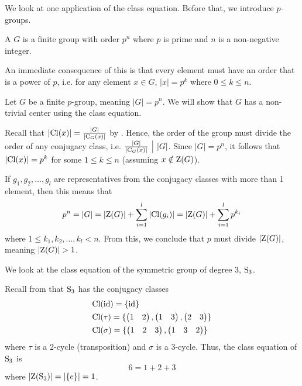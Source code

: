 We look at one application of the class equation. Before that, we introduce $p$-groups.

\begin{definition}
    A  $G$ is a finite group with order $p^n$ where $p$ is prime and $n$ is a non-negative integer.
\end{definition}
An immediate consequence of this is that every element must have an order that is a power of $p$, i.e. for any element $x \in G$, $|x| = p^k$ where $0 \leq k \leq n$.

\begin{example}\label{example-group-with-prime-power-order-has-non-trivial-center}
    Let $G$ be a finite $p$-group, meaning $|G| = p^n$. We will show that $G$ has a non-trivial center using the class equation.

    Recall that $|\mathrm{Cl}(x)| = \frac{|G|}{|\mathrm{C}_{G}(x)|}$ by . Hence, the order of the group must divide the order of any conjugacy class, i.e. $\frac{|G|}{|\Centralizer{G}{x}|} \vert |G|$. Since $|G| = p^n$, it follows that $|\mathrm{Cl}(x)| = p^k$ for some $1 \leq k \leq n$ (assuming $x \notin \mathrm{Z}(G)$).

    If $g_1, g_2, \dots, g_l$ are representatives from the conjugacy classes with more than 1 element, then this means that
    \[
        p^n = |G| = |\mathrm{Z}(G)| + \sum_{i=1}^l |\mathrm{Cl}(g_i)| = |\mathrm{Z}(G)| + \sum_{i=1}^l p^{k_i}
    \]
    where $1 \leq k_1, k_2, \dots, k_l < n$. From this, we conclude that $p$ must divide $|\mathrm{Z}(G)|$, meaning $|\mathrm{Z}(G)| > 1$.
\end{example}

\begin{example}
    We look at the class equation of the symmetric group of degree 3, $\mathrm{S}_{3}$.

    Recall from  that $\mathrm{S}_{3}$ has the conjugacy classes
    \begin{align*}
        &\mathrm{Cl}(\mathrm{id}) = \{\mathrm{id}\}\\
        &\mathrm{Cl}(\tau) = \{\begin{pmatrix}1 & 2\end{pmatrix}, \begin{pmatrix}1 & 3\end{pmatrix}, \begin{pmatrix}2 & 3\end{pmatrix}\}\\
        &\mathrm{Cl}(\sigma) = \{\begin{pmatrix}1 & 2 & 3\end{pmatrix}, \begin{pmatrix}1 & 3 & 2\end{pmatrix}\}
    \end{align*}
    where $\tau$ is a 2-cycle (transposition) and $\sigma$ is a 3-cycle. Thus, the class equation of $\mathrm{S}_{3}$ is
    \[
        6 = 1 + 2 + 3
    \]
    where $|\mathrm{Z}(\mathrm{S}_{3})| = |\{e\}| = 1$.
\end{example}

